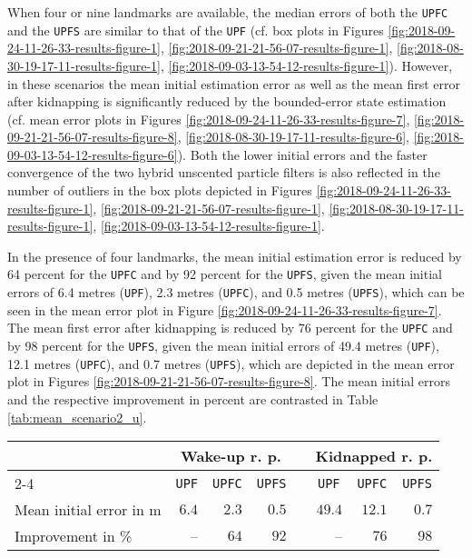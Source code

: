 When four or nine landmarks are available, the median errors of both the \texttt{UPFC} and the \texttt{UPFS} are similar to that of the \texttt{UPF} (cf. box plots in Figures \ref{fig:2018-09-24-11-26-33-results-figure-1}, \ref{fig:2018-09-21-21-56-07-results-figure-1}, \ref{fig:2018-08-30-19-17-11-results-figure-1}, \ref{fig:2018-09-03-13-54-12-results-figure-1}). However, in these scenarios the mean initial estimation error as well as the mean first error after kidnapping is significantly reduced by the bounded-error state estimation (cf. mean error plots in Figures \ref{fig:2018-09-24-11-26-33-results-figure-7}, \ref{fig:2018-09-21-21-56-07-results-figure-8}, \ref{fig:2018-08-30-19-17-11-results-figure-6}, \ref{fig:2018-09-03-13-54-12-results-figure-6}). Both the lower initial errors and the faster convergence of the two hybrid unscented particle filters is also reflected in the number of outliers in the box plots depicted in Figures \ref{fig:2018-09-24-11-26-33-results-figure-1}, \ref{fig:2018-09-21-21-56-07-results-figure-1}, \ref{fig:2018-08-30-19-17-11-results-figure-1}, \ref{fig:2018-09-03-13-54-12-results-figure-1}.


In the presence of four landmarks, the mean initial estimation error is reduced by 64 percent for the \texttt{UPFC} and by 92 percent for the \texttt{UPFS}, given the mean initial errors of 6.4 metres (\texttt{UPF}), 2.3 metres (\texttt{UPFC}), and 0.5 metres (\texttt{UPFS}), which can be seen in the mean error plot in Figure \ref{fig:2018-09-24-11-26-33-results-figure-7}. The mean first error after kidnapping is reduced by 76 percent for the \texttt{UPFC} and by 98 percent for the \texttt{UPFS}, given the mean initial errors of 49.4 metres (\texttt{UPF}), 12.1 metres (\texttt{UPFC}), and 0.7 metres (\texttt{UPFS}), which are depicted in the mean error plot in Figures \ref{fig:2018-09-21-21-56-07-results-figure-8}. The mean initial errors and the respective improvement in percent are contrasted in Table \ref{tab:mean_scenario2_u}.

\begin{table*}\centering
{}
\begin{tabular}{@{}lrrrrrrr@{}}\toprule
& \multicolumn{3}{c}{Wake-up r. p.} & \phantom{a} & \multicolumn{3}{c}{Kidnapped r. p.} \\ 
\cmidrule{2-4} \cmidrule{6-8}
 & \multicolumn{1}{c}{\texttt{UPF}} & \multicolumn{1}{c}{\texttt{UPFC}} & \multicolumn{1}{c}{\texttt{UPFS}} & & \multicolumn{1}{c}{\texttt{UPF}} & \multicolumn{1}{c}{\texttt{UPFC}} & \multicolumn{1}{c}{\texttt{UPFS}} \\
\midrule 
Mean initial error in m & $6.4$ & $2.3$ & $0.5$ & & $49.4$ & $12.1$ & $0.7$ \\              
Improvement in \%  & -- & $64$ & $92$ & & -- & $76$ & $98$ \\ 
\bottomrule
\end{tabular}
\caption{Mean initial errors and errors after kidnapping for the unscented particle filters in Scenario 2.}
\label{tab:mean_scenario2_u}
\end{table*}

